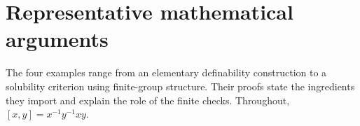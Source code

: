 \section{Representative mathematical arguments}
\label{sec:examples}

The four examples range from an elementary definability construction
to a solubility criterion using finite-group structure. Their proofs
state the ingredients they import and explain the role of the finite
checks. Throughout, $[x,y]=x^{-1}y^{-1}xy$.






